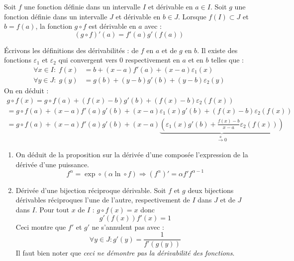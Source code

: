 \begin{prop}
 Soit $f$ une fonction définie dans un intervalle $I$ et dérivable en $a\in I$. Soit $g$ une fonction définie dans un intervalle $J$ et dérivable en $b\in J$. Lorsque $f(I)\subset J$ et $b=f(a)$, la fonction $g\circ f$ est dérivable en $a$ avec :
\begin{displaymath}
 (g \circ f)'(a) = f'(a) g'(f(a))
\end{displaymath}
\end{prop}
\begin{demo}
 \'Ecrivons les définitions des dérivabilités : de $f$ en $a$ et de $g$ en $b$. Il existe des fonctions $\varepsilon_1$ et $\varepsilon_2$ qui convergent vers $0$ respectivement en $a$ et en $b$ telles que :
\begin{align*}
 \forall x\in I :\; f(x) &= b +(x-a)f'(a)+(x-a)\varepsilon_1(x)\\
 \forall y\in J :\; g(y) &= g(b) +(y-b)g'(b)+(y-b)\varepsilon_2(y)
\end{align*}
On en déduit :
\begin{multline*}
 g\circ f(x) = g\circ f(a) + (f(x)-b)g'(b) +(f(x)-b)\varepsilon_2(f(x)) \\
= g\circ f(a) + (x-a)f'(a)g'(b) +(x-a)\varepsilon_1(x)g'(b) + (f(x)-b)\varepsilon_2(f(x)) \\
= g\circ f(a) + (x-a)f'(a)g'(b) +
(x-a)\underset{\xrightarrow{a}0}{\underbrace{\left( \varepsilon_1(x)g'(b) + \frac{f(x)-b}{x-a}\varepsilon_2(f(x))\right)}} 
\end{multline*}
\end{demo}
\begin{rems}
 \begin{enumerate}
  \item On déduit de la proposition sur la dérivée d'une composée l'expression de la dérivée d'une puissance.
\begin{displaymath}
 f^\alpha = \exp \circ (\alpha \ln \circ f) \Rightarrow (f^\alpha)' = \alpha f' f^{\alpha -1}
\end{displaymath}
  \item Dérivée d'une bijection réciproque dérivable. Soit $f$ et $g$ deux bijections dérivables réciproques l'une de l'autre, respectivement de $I$ dans $J$ et de $J$ dans $I$. Pour tout $x$ de $I$ : $g\circ f(x)=x$ donc
\begin{displaymath}
 g'(f(x))f'(x)=1
\end{displaymath}
 Ceci montre que $f'$ et $g'$ ne s'annulent pas avec :
\begin{displaymath}
 \forall y\in J : g'(y)=\frac{1}{f'(g(y))}
\end{displaymath}
Il faut bien noter que \emph{ceci ne démontre pas la dérivabilité des fonctions}.
 \end{enumerate}
\end{rems}

